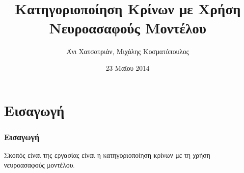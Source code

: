 \documentclass[xetex,serif,mathserif,14pt]{beamer}
\title[Κατηγοριοποίηση Κρίνων]{Κατηγοριοποίηση Κρίνων με Χρήση Νευροασαφούς Μοντέλου} %
\author[Χατσατριάν, Κοσματόπουλος]{Άνι Χατσατριάν, Μιχάλης Κοσματόπουλος} %
\institute[ΑΤΕΙΘ] %
{
Αλεξάνδρειο Τεχνολογικό Εκπαιδευτικό Ίδρυμα Θεσσαλονίκης \\ %
\medskip
\textit{\{achatsat, mkosm\}@it.teithe.gr} %
}
\date{23 Μαΐου 2014} %
\begin{document}
\begin{frame}[plain]
\titlepage %
\end{frame}




\section{Εισαγωγή} %

\begin{frame}
\frametitle{Εισαγωγή}
Σκοπός είναι της εργασίας είναι η κατηγοριοποίηση κρίνων με τη χρήση νευροασαφούς μοντέλου.

\end{frame}

\end{document}
